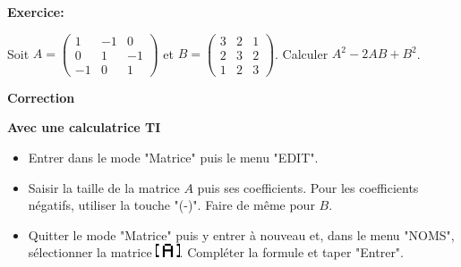 \documentclass{cornouaille}
\begin{document}
\begin{methode}

 

\textbf{Exercice:}

 \renewcommand{\arraystretch}{0.9}
Soit
$A=\begin{pmatrix}
1 & -1 & 0 \\
0 & 1 & -1 \\
-1 & 0 & 1
\end{pmatrix}$ et $B=\begin{pmatrix}
3 & 2 & 1 \\
2 & 3 & 2 \\
1 & 2 & 3
\end{pmatrix}$. Calculer $A^2-2AB+B^2$.




\textbf{Correction}



\textcolor{H1}{\bfseries Avec une calculatrice TI %
}
\begin{itemize}
\item Entrer dans le mode "Matrice"  puis le menu "EDIT".
\item Saisir la taille de la matrice $A$ puis ses coefficients. Pour les coefficients négatifs, utiliser la touche "(-)". Faire de même pour $B$.
\item Quitter le mode "Matrice" puis y entrer à nouveau et, dans le menu "NOMS", sélectionner la matrice \includegraphics[height=4mm]{TI_[A].eps}.
Compléter la formule et taper "Entrer".
 \begin{center}
    \hspace{.5cm} 
   \end{center}
\end{itemize}


\end{methode}
\end{document}
